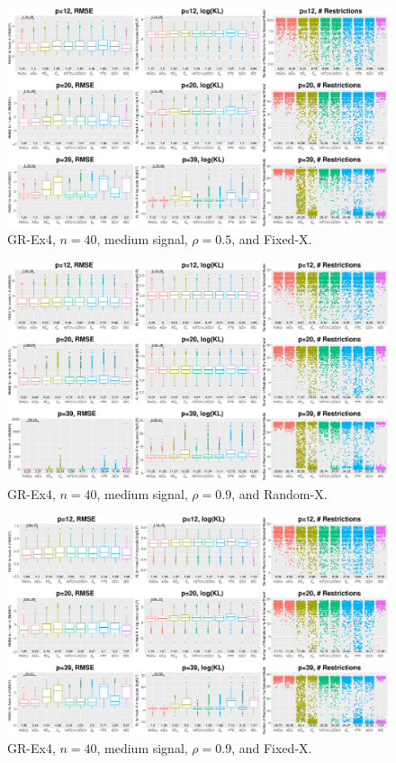\begin{figure}[!ht]
\centering
\includegraphics[width=\textwidth]{figures/supplement/fixedx_GR-Ex4_n40_msnr_rho05.eps}
\caption{GR-Ex4, $n=40$, medium signal, $\rho=0.5$, and Fixed-X.}
\end{figure}
\clearpage
\begin{figure}[!ht]
\centering
\includegraphics[width=\textwidth]{figures/supplement/randomx_GR-Ex4_n40_msnr_rho09.eps}
\caption{GR-Ex4, $n=40$, medium signal, $\rho=0.9$, and Random-X.}
\end{figure}
\begin{figure}[!ht]
\centering
\includegraphics[width=\textwidth]{figures/supplement/fixedx_GR-Ex4_n40_msnr_rho09.eps}
\caption{GR-Ex4, $n=40$, medium signal, $\rho=0.9$, and Fixed-X.}
\end{figure}
